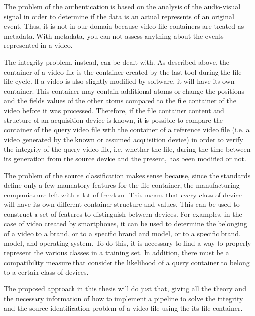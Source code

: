 The problem of the authentication is based on the analysis of the audio-visual signal in order to determine if the data is an actual represents of an original event. Thus, it is not in our domain because video file containers are treated as metadata. With metadata, you can not assess anything about the events represented in a video.

The integrity problem, instead, can be dealt with. As described above, the container of a video file is the container created by the last tool during the file life cycle. If a video is also slightly modified by software, it will have its own container. This container may contain additional atoms or change the positions and the fields values of the other atoms compared to the file container of the video before it was processed. Therefore, if the file container content and structure of an acquisition device is known, it is possible to compare the container of the query video file with the container of a reference video file (i.e. a video generated by the known or assumed acquisition device) in order to verify the integrity of the query video file, i.e. whether the file, during the time between its generation from the source device and the present, has been modified or not.

The problem of the source classification makes sense because, since the standards define only a few mandatory features for the file container, the manufacturing companies are left with a lot of freedom. This means that every class of device will have its own different container structure and values. This can be used to construct a set of features to distinguish between devices. For examples, in the case of video created by smartphones, it can be used to determine the belonging of a video to a brand, or to a specific brand and model, or to a specific brand, model, and operating system.
To do this, it is necessary to find a way to properly represent the various classes in a training set. In addition, there must be a compatibility measure that consider the likelihood of a query container to belong to a certain class of devices.

The proposed approach in this thesis will do just that, giving all the theory and the necessary information of how to implement a pipeline to solve the integrity and the source identification problem of a video file using the its file container.